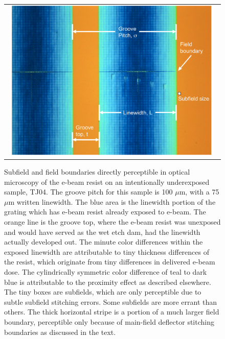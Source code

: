 \begin{figure}
\begin{center}
 \begin{tabular}{c}
    \includegraphics[width=0.96\textwidth]{chSPIE_2014_ebeam/figs/subfields_TJ04_Zeiss.pdf}
   \end{tabular}
  \end{center}
  \caption[TJ04 under Zeiss]{\label{fig:TJ04Zeiss} Subfield and field boundaries directly perceptible in optical microscopy of the e-beam resist on an intentionally underexposed sample, TJ04.  The groove pitch for this sample is 100 $\mu$m, with a 75 $\mu$m written linewidth.  The blue area is the linewidth portion of the grating which has e-beam resist already exposed to e-beam.  The orange line is the groove top, where the e-beam resist was unexposed and would have served as the wet etch dam, had the linewidth actually developed out.  The minute color differences within the exposed linewidth are attributable to tiny thickness differences of the resist, which originate from tiny differences in delivered e-beam dose.  The cylindrically symmetric color difference of teal to dark blue is attributable to the proximity effect as described elsewhere\cite{2005SPIE.5720...68W}.  The tiny boxes are subfields, which are only perceptible due to subtle subfield stitching errors.  Some subfields are more errant than others.  The thick horizontal stripe is a portion of a much larger field boundary, perceptible only because of main-field deflector stitching boundaries as discussed in the text.}
\end{figure}

